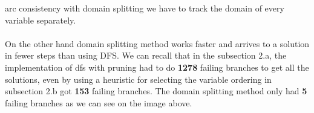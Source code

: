 \documentclass{article}
\begin{document}
\begin{enumerate}[label=(\alph*)]
{        arc consistency with domain splitting we have to track the domain of every variable separately. \\ \\
        On the other hand domain splitting method works faster and arrives to a solution in fewer 
        steps than using DFS. We can recall that in the subsection 2.a, the implementation of 
        dfs with pruning had to do \textbf{1278} failing branches to get all the solutions, even by 
        using a heuristic for selecting the variable ordering in subsection 2.b got \textbf{153} failing 
        branches. The domain splitting method only had \textbf{5} failing branches as we can see on the 
        image above.
    }
\end{enumerate}

\clearpage
\end{document}
